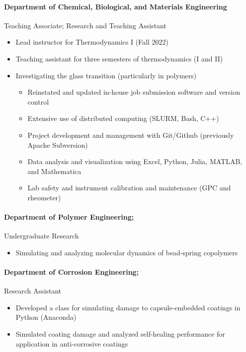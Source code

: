 \documentclass{my_cv}
\begin{document}
\paragraph{Department of Chemical, Biological, and Materials Engineering\\}
Teaching Associate; Research and Teaching Assistant
\begin{itemize}
    \item Lead instructor for Thermodynamics I (Fall 2022)
    \item Teaching assistant for three semesters of thermodynamics (I and II)
    \item Investigating the glass transition (particularly in polymers)
    \begin{itemize}
        \item Reinstated and updated in-house job submission software and version control
        \item Extensive use of distributed computing (SLURM, Bash, C++)
        \item Project development and management with Git/Git\-hub (previously Apache Subversion)
        \item Data analysis and visualization using Excel, Python, Julia, MATLAB, and Math\-e\-ma\-ti\-ca
        \item Lab safety and instrument calibration and maintenance (GPC and rheometer)
    \end{itemize}
\end{itemize}

\paragraph{Department of Polymer Engineering;}
Undergraduate Research
\begin{itemize}
    \item Simulating and analyzing molecular dynamics of bead-spring co\-polymers
\end{itemize}

\paragraph{Department of Corrosion Engineering;}
Research Assistant
\begin{itemize}
    \item Developed a class for simulating damage to capsule-embedded coatings in Python (Anaconda)
    \item Simulated coating damage and analyzed self-healing performance for application in anti-corrosive coatings
\end{itemize}
\end{document}
